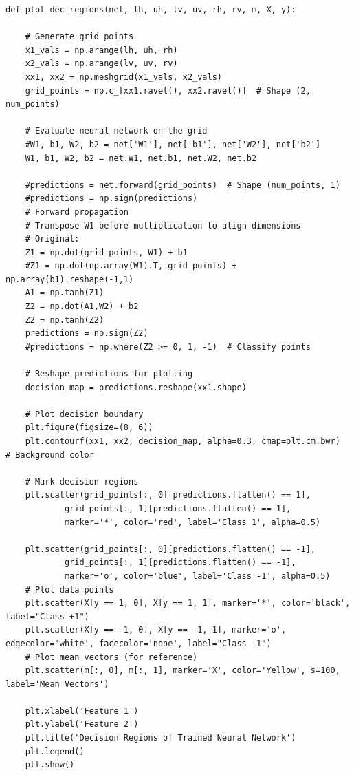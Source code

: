 \documentclass[a4paper,12pt]{article}
\begin{document}
\begin{lstlisting}[style=python]
def plot_dec_regions(net, lh, uh, lv, uv, rh, rv, m, X, y):

    # Generate grid points
    x1_vals = np.arange(lh, uh, rh)
    x2_vals = np.arange(lv, uv, rv)
    xx1, xx2 = np.meshgrid(x1_vals, x2_vals)
    grid_points = np.c_[xx1.ravel(), xx2.ravel()]  # Shape (2, num_points)

    # Evaluate neural network on the grid
    #W1, b1, W2, b2 = net['W1'], net['b1'], net['W2'], net['b2']
    W1, b1, W2, b2 = net.W1, net.b1, net.W2, net.b2

    #predictions = net.forward(grid_points)  # Shape (num_points, 1)
    #predictions = np.sign(predictions)
    # Forward propagation
    # Transpose W1 before multiplication to align dimensions
    # Original:
    Z1 = np.dot(grid_points, W1) + b1
    #Z1 = np.dot(np.array(W1).T, grid_points) + np.array(b1).reshape(-1,1)
    A1 = np.tanh(Z1)
    Z2 = np.dot(A1,W2) + b2
    Z2 = np.tanh(Z2)
    predictions = np.sign(Z2)
    #predictions = np.where(Z2 >= 0, 1, -1)  # Classify points

    # Reshape predictions for plotting
    decision_map = predictions.reshape(xx1.shape)

    # Plot decision boundary
    plt.figure(figsize=(8, 6))
    plt.contourf(xx1, xx2, decision_map, alpha=0.3, cmap=plt.cm.bwr)  # Background color

    # Mark decision regions
    plt.scatter(grid_points[:, 0][predictions.flatten() == 1],
            grid_points[:, 1][predictions.flatten() == 1],
            marker='*', color='red', label='Class 1', alpha=0.5)

    plt.scatter(grid_points[:, 0][predictions.flatten() == -1],
            grid_points[:, 1][predictions.flatten() == -1],
            marker='o', color='blue', label='Class -1', alpha=0.5)
    # Plot data points
    plt.scatter(X[y == 1, 0], X[y == 1, 1], marker='*', color='black', label="Class +1")
    plt.scatter(X[y == -1, 0], X[y == -1, 1], marker='o', edgecolor='white', facecolor='none', label="Class -1")
    # Plot mean vectors (for reference)
    plt.scatter(m[:, 0], m[:, 1], marker='X', color='Yellow', s=100, label='Mean Vectors')

    plt.xlabel('Feature 1')
    plt.ylabel('Feature 2')
    plt.title('Decision Regions of Trained Neural Network')
    plt.legend()
    plt.show()
\end{lstlisting}

\newpage
\end{document}
